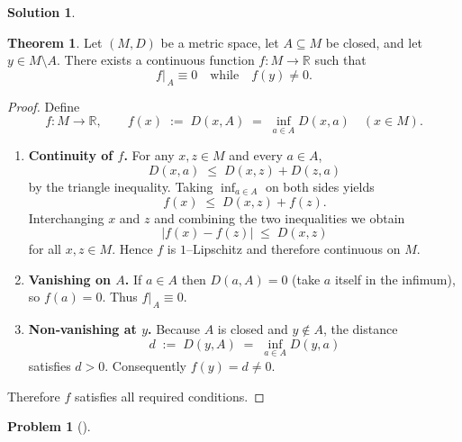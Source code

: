 \documentclass[12pt]{article}
\theoremstyle{definition} %
\newtheorem{solution}{Solution}
\newtheorem{problem}{Problem}
\newtheorem{theorem}{Theorem}
\theoremstyle{plain} %
\begin{document}
\begin{solution}
  \begin{theorem}
    Let $(M,D)$ be a metric space, let $A\subseteq M$ be closed, and let $y\in M\setminus A$.  
    There exists a continuous function $f:M\to\mathbb{R}$ such that
    \[
    f\bigl\lvert_{\,A}\equiv 0
    \quad\text{while}\quad
    f(y)\neq 0.
    \]
    \end{theorem}
    
    \begin{proof}
    Define
    \[
    f:M\longrightarrow\mathbb{R},
    \qquad
    f(x)\;:=\;D(x,A)\;=\;\inf_{a\in A}D(x,a)\quad(x\in M).
    \]
    
    \begin{enumerate}
        \item[\textbf{1.}] \textbf{Continuity of $f$.}  
              For any $x,z\in M$ and every $a\in A$,
              \[
                    D(x,a)\;\le\;D(x,z)+D(z,a)
              \]
              by the triangle inequality.  
              Taking $\inf_{a\in A}$ on both sides yields
              \[
                    f(x)\;\le\;D(x,z)+f(z).
              \]
              Interchanging $x$ and $z$ and combining the two inequalities we obtain
              \[
                    |f(x)-f(z)|\;\le\;D(x,z)
              \]
              for all $x,z\in M$.  
              Hence $f$ is $1$–Lipschitz and therefore continuous on $M$.
    
        \item[\textbf{2.}] \textbf{Vanishing on $A$.}  
              If $a\in A$ then $D(a,A)=0$ (take $a$ itself in the infimum), so $f(a)=0$.  
              Thus $f\bigl\lvert_{\,A}\equiv 0$.
    
        \item[\textbf{3.}] \textbf{Non‑vanishing at $y$.}  
              Because $A$ is closed and $y\notin A$, the distance
              \[
                    d\;:=\;D(y,A)\;=\;\inf_{a\in A}D(y,a)
              \]
              satisfies $d>0$.  
              Consequently $f(y)=d\neq 0$.
    
    \end{enumerate}
    
    \noindent
    Therefore $f$ satisfies all required conditions.  \qedhere
    \end{proof} 
\end{solution}
\begin{problem}[]
  
\end{problem}
\end{document}
